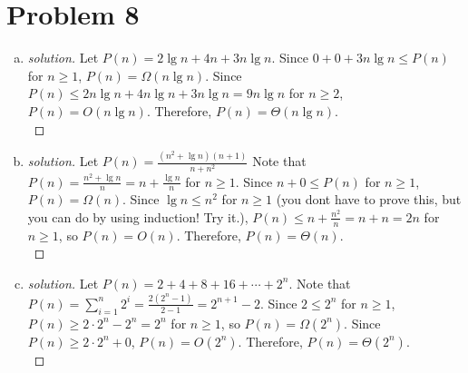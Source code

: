 \section*{Problem 8}
\begin{enumerate} [(a)]
	\item
	\begin{proof} [solution]
		Let $P(n) = 2\lg{n} + 4n + 3n\lg{n}$. Since $0 + 0 + 3n\lg{n} \leq P(n)$ for $n \geq 1$, $P(n) = \Omega(n\lg{n})$. Since $P(n) \leq 2n\lg{n} + 4n\lg{n} + 3n\lg{n} = 9n\lg{n}$ for $n \geq 2$, $P(n) = O(n\lg{n})$. Therefore, $P(n) = \Theta(n\lg{n})$.\\
	\end{proof}
	\item 
	\begin{proof} [solution]
		Let $P(n) = \frac{(n^2 + \lg{n})(n + 1)}{n + n^2}$ Note that $P(n) = \frac{n^2 + \lg{n}}{n} = n + \frac{\lg{n}}{n}$ for $n \geq 1$. Since $n + 0 \leq P(n)$ for $n \geq 1$, $P(n) = \Omega(n)$. Since $\lg{n} \leq n^2$ for $n \geq 1$ (you don\textquotesingle t have to prove this, but you can do by using induction! Try it.), $P(n) \leq n + \frac{n^2}{n} = n + n = 2n$ for $n \geq 1$, so $P(n) = O(n)$. Therefore, $P(n) = \Theta(n)$.\\
	\end{proof}
	\item 
	\begin{proof} [solution]
		Let $P(n) = 2 + 4 + 8 + 16 + \cdots + 2^n$. Note that $P(n) = \sum\limits_{i = 1}^{n}{2^i} = \frac{2(2^n  - 1)}{2 - 1} = 2^{n + 1} - 2$. Since $2 \leq 2^n$ for $n \geq 1$, $P(n) \geq 2\cdot2^n - 2^n = 2^n$ for $n \geq 1$, so $P(n) = \Omega(2^n)$. Since $P(n) \geq 2\cdot2^n + 0$, $P(n) = O(2^n)$. Therefore, $P(n) = \Theta(2^n)$.\\
	\end{proof}
\end{enumerate}